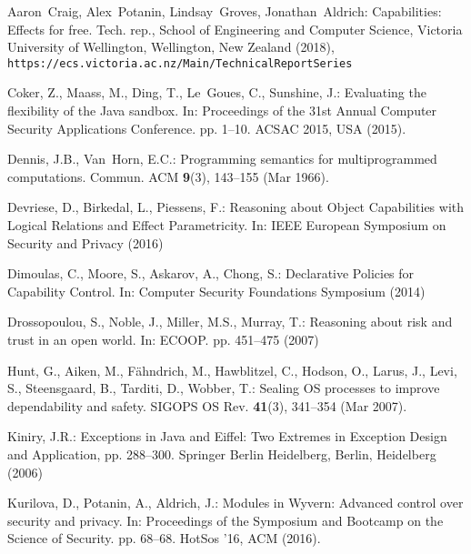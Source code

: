 \documentclass[runningheads]{llncs}
\begin{document}
\begin{thebibliography}{10}
\vspace{-0.2cm}
\providecommand{\url}[1]{\texttt{#1}}
\providecommand{\urlprefix}{URL }
\providecommand{\doi}[1]{https://doi.org/#1}

  Aaron~Craig, Alex~Potanin, Lindsay~Groves, Jonathan~Aldrich:
  Capabilities: Effects for free. 
  Tech. rep., School of Engineering and Computer Science, Victoria University of
  Wellington, Wellington, New Zealand (2018),
  \url{https://ecs.victoria.ac.nz/Main/TechnicalReportSeries} 

Coker, Z., Maass, M., Ding, T., Le~Goues, C., Sunshine, J.: Evaluating the
  flexibility of the Java sandbox. In: Proceedings of the 31st Annual Computer
  Security Applications Conference. pp. 1--10. ACSAC 2015, USA (2015).

Dennis, J.B., Van~Horn, E.C.: Programming semantics for multiprogrammed
  computations. Commun. ACM  \textbf{9}(3),  143--155 (Mar 1966).

  Devriese, D., Birkedal, L., Piessens, F.: Reasoning about Object
  Capabilities with Logical Relations and Effect Parametricity. In: IEEE
  European Symposium on Security and Privacy (2016)

  Dimoulas, C., Moore, S., Askarov, A., Chong, S.: Declarative Policies for
  Capability Control. In: Computer Security Foundations Symposium (2014)

Drossopoulou, S., Noble, J., Miller, M.S., Murray, T.: Reasoning about risk and
  trust in an open world. In: ECOOP. pp. 451--475 (2007)

Hunt, G., Aiken, M., F\"{a}hndrich, M., Hawblitzel, C., Hodson, O., Larus, J.,
  Levi, S., Steensgaard, B., Tarditi, D., Wobber, T.: Sealing OS processes to
  improve dependability and safety. SIGOPS OS Rev. \textbf{41}(3),
  341--354 (Mar 2007).

Kiniry, J.R.: Exceptions in Java and Eiffel: Two Extremes in Exception Design
  and Application, pp. 288--300. Springer Berlin Heidelberg, Berlin, Heidelberg
  (2006)

Kurilova, D., Potanin, A., Aldrich, J.: Modules in Wyvern: Advanced control
  over security and privacy. In: Proceedings of the Symposium and Bootcamp on
  the Science of Security. pp. 68--68. HotSos '16, ACM (2016).


\end{thebibliography}
\end{document}
